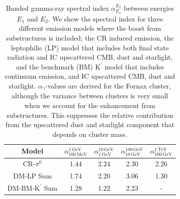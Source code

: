 \documentclass[10pt,aps,pra,reprint,amsmath,amsfonts,amssymb,showpacs,nofootinbib,floatfix]{revtex4-1}
\newcommand{\rmn}{\mathrm}
\newcommand{\Kp}{\rmn{K}^\prime}
\begin{document}
\begin{table}
\begin{tabular}{ccccc}
\hline\hline
      Model & $\alpha_{100\,\rmn{MeV}}^{1\,\rmn{GeV}}$  & 
              $\alpha_{1\,\rmn{GeV}}^{10\,\rmn{GeV}}$   & 
              $\alpha_{10\,\rmn{GeV}}^{100\,\rmn{GeV}}$ &
              $\alpha_{100\,\rmn{GeV}}^{1\,\rmn{TeV}}$  \\
\hline
CR-$\pi^0$      & 1.44 & 2.24 & 2.30 & 2.26 \\
DM-LP Sum       & 1.74 & 2.20 & 3.06 & 1.30 \\
DM-BM-$\Kp$ Sum  & 1.28 & 1.22 & 2.23 & -    \\
\hline\hline
\end{tabular}
\caption{Banded gamma-ray spectral index $\alpha_{E_1}^{E_2}$ between
  energies $E_1$ and $E_2$. We show the spectral index for three
  different emission models where the boost from substructures is
  included; the CR induced emission, the leptophilic (LP) model that
  includes both final state radiation and IC upscattered CMB, dust and
  starlight, and the benchmark (BM) $\Kp$ model that includes
  continuum emission, and IC upscattered CMB, dust and
  starlight. $\alpha_\gamma$-values are derived for the Fornax
  cluster, although the variance between clusters is very small when
  we account for the enhancement from substructures. This suppresses
  the relative contribution from the upscattered dust and starlight
  component that depends on cluster mass. \label{tab:spectral_index}}
\end{table}
\end{document}
